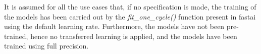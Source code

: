 It is assumed for all the use cases that, if no specification is made, the training of the models has been carried out by the \textit{fit\_one\_cycle()} function present in fastai using the default learning rate. Furthermore, the models have not been pre-trained, hence no transferred learning is applied, and the models have been trained using full precision.\\









